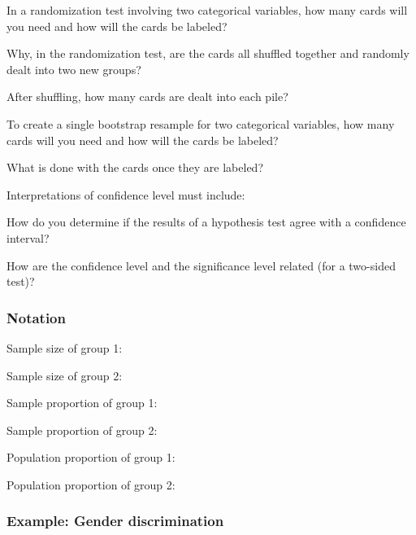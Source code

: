\documentclass[
]{report}
\newcommand{\rgs}{\vspace{12pt}} %
\begin{document}
In a randomization test involving two categorical variables, how many cards will you need and how will the cards be labeled?
\rgs

Why, in the randomization test, are the cards all shuffled together and randomly dealt into two new groups?
\rgs

After shuffling, how many cards are dealt into each pile?
\rgs

To create a single bootstrap resample for two categorical variables, how many cards will you need and how will the cards be labeled?
\rgs

What is done with the cards once they are labeled?
\rgs

Interpretations of confidence level must include:
\rgs
\rgs

How do you determine if the results of a hypothesis test agree with a confidence interval?
\rgs
\rgs

How are the confidence level and the significance level related (for a two-sided test)?
\rgs

\hypertarget{notation}{%
\subsubsection*{Notation}\label{notation}}

Sample size of group 1:
\rgs

Sample size of group 2:
\rgs

Sample proportion of group 1:
\rgs

Sample proportion of group 2:
\rgs

Population proportion of group 1:
\rgs

Population proportion of group 2:
\rgs

\hypertarget{example-gender-discrimination}{%
\subsubsection*{Example: Gender discrimination}\label{example-gender-discrimination}}
\end{document}
